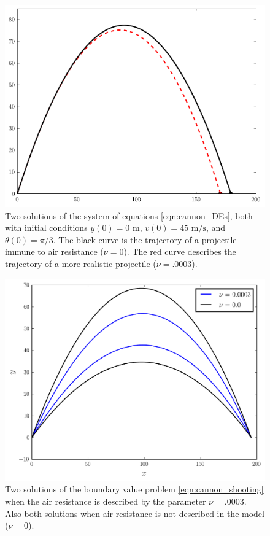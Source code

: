 \begin{figure}
\includegraphics[width=\textwidth]{Cannon_with_AirResistance.pdf}
\caption{Two solutions of the system of equations \eqref{eqn:cannon_DEs}, both with initial conditions  $y(0) = 0 \text{ m}$, $ v(0) = 45 \text{ m/s}$, and $\theta(0)=\pi/3$.
The black curve is the trajectory of a projectile immune to air resistance ($\nu = 0$).
The red curve describes the trajectory of a more realistic projectile ($\nu = .0003$).}
\label{fig:shooting_cannon_comparison1}
\end{figure}

\begin{figure}
\includegraphics[width=\textwidth]{Cannon_Shooting.pdf}
\caption{Two solutions of the boundary value problem \eqref{eqn:cannon_shooting} when the air resistance is described by the parameter $\nu = .0003$.
Also both solutions when air resistance is not described in the model ($\nu = 0$).}
\label{fig:shooting_cannon_comparison2}
\end{figure} 